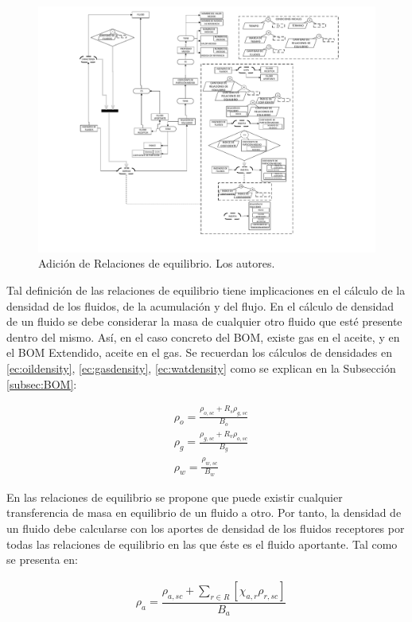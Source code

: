 \begin{figure}[h]
	\centering%
	\includegraphics[width=0.9\linewidth]{Fig/Equilibrium.pdf}%
	\caption[Adición de Relaciones de equilibrio.]{Adición de Relaciones de equilibrio. Los autores.} \label{fig:EqRelation}
\end{figure}

Tal definición de las relaciones de equilibrio tiene implicaciones en el cálculo de la densidad de los fluidos, de la acumulación y del flujo. En el cálculo de densidad de un fluido se debe considerar la masa de cualquier otro fluido que esté presente dentro del mismo. Así, en el caso concreto del BOM, existe gas en el aceite, y en el BOM Extendido,
aceite en el gas. Se recuerdan los cálculos de densidades en \ref{ec:oildensity}, \ref{ec:gasdensity}, \ref{ec:watdensity} como se explican en la Subsección \ref{subsec:BOM}:

\begin{align*}
&\rho_{o} = \frac{\rho_{o,sc} + R_{s}\rho_{g,sc}}{B_{o}}\\
&\rho_{g} = \frac{\rho_{g,sc} + R_{v}\rho_{o,sc}}{B_{g}}\\
&\rho_{w} = \frac{\rho_{w,sc}}{B_{w}}
\end{align*}

En las relaciones de equilibrio se propone que puede existir cualquier transferencia de masa en equilibrio de un fluido a otro. Por tanto, la densidad de un fluido debe calcularse con los aportes de densidad de los fluidos receptores por todas las relaciones de equilibrio en las que éste es el fluido aportante. Tal como se presenta en:

\begin{align}
	\label{ec:generaldensity}&\rho_{a} = \dfrac{\rho_{a,sc} + \sum_{r \in R}\left[\chi_{a,r}\rho_{r,sc}\right]}{B_{a}}
\end{align}

